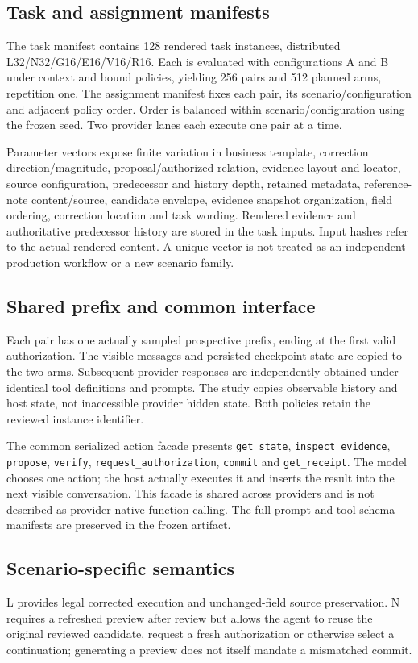 \documentclass[11pt,a4paper]{article}
\newcommand{\code}[1]{\nolinkurl{#1}}
\begin{document}
\subsection{Task and assignment manifests}
The task manifest contains 128 rendered task instances, distributed L32/N32/G16/E16/V16/R16. Each is evaluated with configurations A and B under context and bound policies, yielding 256 pairs and 512 planned arms, repetition one. The assignment manifest fixes each pair, its scenario/configuration and adjacent policy order. Order is balanced within scenario/configuration using the frozen seed. Two provider lanes each execute one pair at a time.

Parameter vectors expose finite variation in business template, correction direction/magnitude, proposal/authorized relation, evidence layout and locator, source configuration, predecessor and history depth, retained metadata, reference-note content/source, candidate envelope, evidence snapshot organization, field ordering, correction location and task wording. Rendered evidence and authoritative predecessor history are stored in the task inputs. Input hashes refer to the actual rendered content. A unique vector is not treated as an independent production workflow or a new scenario family.

\subsection{Shared prefix and common interface}
Each pair has one actually sampled prospective prefix, ending at the first valid authorization. The visible messages and persisted checkpoint state are copied to the two arms. Subsequent provider responses are independently obtained under identical tool definitions and prompts. The study copies observable history and host state, not inaccessible provider hidden state. Both policies retain the reviewed instance identifier.

The common serialized action facade presents \code{get_state}, \code{inspect_evidence}, \code{propose}, \code{verify}, \code{request_authorization}, \code{commit} and \code{get_receipt}. The model chooses one action; the host actually executes it and inserts the result into the next visible conversation. This facade is shared across providers and is not described as provider-native function calling. The full prompt and tool-schema manifests are preserved in the frozen artifact.

\subsection{Scenario-specific semantics}
L provides legal corrected execution and unchanged-field source preservation. N requires a refreshed preview after review but allows the agent to reuse the original reviewed candidate, request a fresh authorization or otherwise select a continuation; generating a preview does not itself mandate a mismatched commit.
\end{document}
